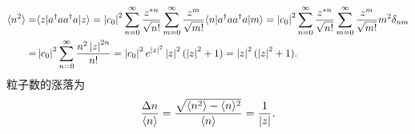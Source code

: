 \documentclass{assignment}
\begin{document}
\begin{pf}
\begin{itemize}
        \begin{align}
            \langle n^2\rangle=&\langle z\rvert a^{\dagger}aa^{\dagger}a\lvert z\rangle=\left\lvert c_0\right\rvert^2\sum_{n=0}^{\infty}\frac{z^{*n}}{\sqrt{n!}}\sum_{m=0}^{\infty}\frac{z^m}{\sqrt{m!}}\langle n\rvert a^{\dagger}aa^{\dagger}a\lvert m\rangle=\left\lvert c_0\right\rvert^2\sum_{n=0}^{\infty}\frac{z^{*n}}{\sqrt{n!}}\sum_{m=0}^{\infty}\frac{z^m}{\sqrt{m!}}m^2\delta_{nm}\\
            =&\left\lvert c_0\right\rvert^2\sum_{n=0}^{\infty}\frac{n^2\left\lvert z\right\rvert^{2n}}{n!}=\left\lvert c_0\right\rvert^2e^{\left\lvert z\right\rvert^2}\left\lvert z\right\rvert^2(\left\lvert z\right\rvert^2+1)=\left\lvert z\right\rvert^2(\left\lvert z\right\rvert^2+1).
        \end{align}
        粒子数的涨落为
        \begin{align}
            \frac{\Delta n}{\langle n\rangle}=\frac{\sqrt{\langle n^2\rangle-\langle n\rangle^2}}{\langle n\rangle}=\frac{1}{\left\lvert z\right\rvert}.
        \end{align}
    \end{itemize}
\end{pf}
\end{document}
